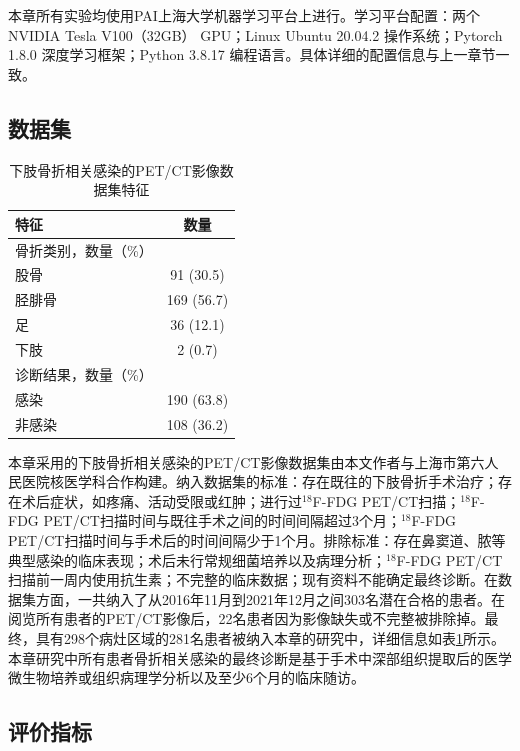 本章所有实验均使用PAI上海大学机器学习平台上进行。学习平台配置：两个NVIDIA Tesla V100（32GB） GPU；Linux Ubuntu 20.04.2 操作系统；Pytorch 1.8.0 深度学习框架；Python 3.8.17 编程语言。具体详细的配置信息与上一章节一致。

\subsection{数据集}

\begin{table}[htbp]
  \centering
  \caption{下肢骨折相关感染的PET/CT影像数据集特征}
  \begin{tabular}{lc}
    \toprule
    特征         & 数量       \\
    \midrule
    骨折类别，数量（\%）      \\
    \quad 股骨   & 91 (30.5)  \\
    \quad 胫腓骨 & 169 (56.7) \\
    \quad 足     & 36 (12.1)  \\
    \quad 下肢   & 2 (0.7)    \\
    诊断结果，数量（\%）      \\
    \quad 感染   & 190 (63.8) \\
    \quad 非感染 & 108 (36.2) \\
    \bottomrule
  \end{tabular}
  \label{tab:chap04_dataset}
\end{table}

本章采用的下肢骨折相关感染的PET/CT影像数据集由本文作者与上海市第六人民医院核医学科合作构建。纳入数据集的标准：存在既往的下肢骨折手术治疗；存在术后症状，如疼痛、活动受限或红肿；进行过\(^{18}\)F-FDG PET/CT扫描；\(^{18}\)F-FDG PET/CT扫描时间与既往手术之间的时间间隔超过3个月；\(^{18}\)F-FDG PET/CT扫描时间与手术后的时间间隔少于1个月。排除标准：存在鼻窦道、脓等典型感染的临床表现；术后未行常规细菌培养以及病理分析；\(^{18}\)F-FDG PET/CT扫描前一周内使用抗生素；不完整的临床数据；现有资料不能确定最终诊断。在数据集方面，一共纳入了从2016年11月到2021年12月之间303名潜在合格的患者。在阅览所有患者的PET/CT影像后，22名患者因为影像缺失或不完整被排除掉。最终，具有298个病灶区域的281名患者被纳入本章的研究中，详细信息如表\ref{tab:chap04_dataset}所示。本章研究中所有患者骨折相关感染的最终诊断是基于手术中深部组织提取后的医学微生物培养或组织病理学分析以及至少6个月的临床随访。

\subsection{评价指标}


